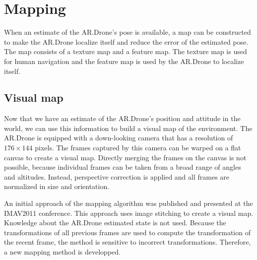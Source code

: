 
	\section{Mapping}
	\label{sec:mapping}
When an estimate of the AR.Drone's pose is available, a map can be constructed to make the AR.Drone localize itself and reduce the error of the estimated pose.
The map consists of a texture map and a feature map.
The texture map is used for human navigation and the feature map is used by the AR.Drone to localize itself.

	\subsection{Visual map}
\label{sec:texture_map}
Now that we have an estimate of the AR.Drone's position and attitude in the world, we can use this information to build a visual map of the environment.
The AR.Drone is equipped with a down-looking camera that has a resolution of $176 \times 144$ pixels.
The frames captured by this camera can be warped on a flat canvas to create a visual map.
Directly merging the frames on the canvas is not possible, because individual frames can be taken from a broad range of angles and altitudes.
Instead, perspective correction is applied and all frames are normalized in size and orientation.

An initial approach of the mapping algorithm was published \cite{Visser2011imav} and presented at the IMAV2011 conference.
This approach uses image stitching \cite{levin2004seamless} to create a visual map.
Knowledge about the AR.Drone estimated state is not used.
Because the transformations of all previous frames are used to compute the transformation of the recent frame, the method is sensitive to incorrect transformations.
Therefore, a new mapping method is developped.


